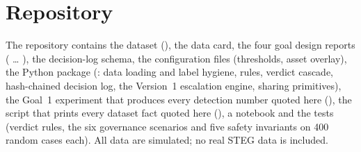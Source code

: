\section*{Repository}
The repository contains the dataset (), the data card, the four goal design reports
( \dots{} ), the decision-log schema, the
configuration files (thresholds, asset overlay), the Python package (: data loading and
label hygiene, rules, verdict cascade, hash-chained decision log, the Version~1 escalation engine, sharing
primitives), the Goal~1 experiment that produces every detection number quoted here
(), the script that prints every dataset fact quoted here
(), a notebook and the tests (verdict rules, the six governance scenarios and five
safety invariants on 400 random cases each). All data are simulated; no real STEG data is
included.

